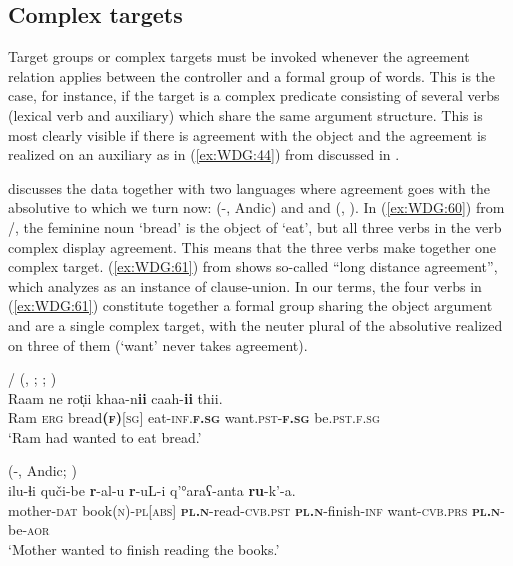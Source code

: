 \documentclass[output=collectionpaper]{langsci/langscibook}
\begin{document}
  \subsection{Complex targets}
\label{sec:WDG:7.4}

Target groups or complex targets must be invoked whenever the agreement relation applies between the controller and a formal group of words. This is the case, for instance, if the target is a complex predicate consisting of several verbs (lexical verb and auxiliary) which share the same argument structure. This is most clearly visible if there is agreement with the object and the agreement is realized on an auxiliary as in (\ref{ex:WDG:44}) from  discussed in .

\cite{Haspelmath1999} discusses the  data together with two languages where agreement goes with the absolutive to which we turn now:  (-, Andic) and  and  (, ). In (\ref{ex:WDG:60}) from /, the feminine noun `bread' is the object of `eat', but all three verbs in the verb complex display agreement. This means that the three verbs make together one complex target. (\ref{ex:WDG:61}) from  shows so-called ``long distance agreement'', which \cite{Haspelmath1999} analyzes as an instance of clause-union. In our terms, the four verbs in (\ref{ex:WDG:61}) constitute together a formal group sharing the object argument and are a single complex target, with the neuter plural of the absolutive realized on three of them (`want' never takes agreement).

\ea\label{ex:WDG:60}
/ (, ; \citealt[23]{Wunderlich1994}; \citealt[147]{Haspelmath1999})\\
\gll	Raam	ne	rot̩ii	khaa-n\textbf{ii}	caah-\textbf{ii}	thii.\\
	Ram	\textsc{erg}	bread\textsc{\textbf{(f)}[sg]}	eat-\textsc{inf.\textbf{f.sg}}	want.\textsc{pst-\textbf{f.sg}}	be.\textsc{pst.f.sg}\\
\glt	`Ram had wanted to eat bread.'\\
\z

\ea\label{ex:WDG:61}
 (-, Andic; \citealt[143]{Haspelmath1999})\\
\gll	ilu-ɬi	quči-be	\textbf{r}-al-u	\textbf{r}-uL-i 	q'°araʕ-anta	\textbf{ru}-k'-a.\\
	mother-\textsc{dat}	book\textsc{(n)-pl[abs]}	\textbf{\textsc{pl.n}}-read-\textsc{cvb.pst}	\textbf{\textsc{pl.n}}-finish-\textsc{inf}	want-\textsc{cvb.prs}	\textbf{\textsc{pl.n}}-be-\textsc{aor}\\
\glt 	`Mother wanted to finish reading the books.'\\
\z
\end{document}
